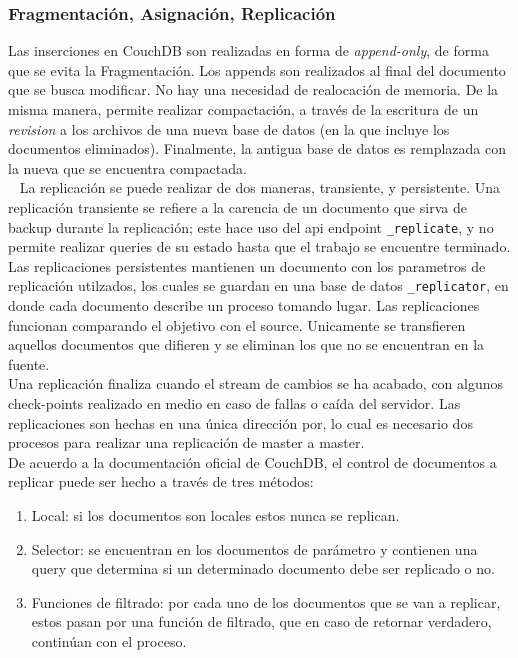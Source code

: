 \documentclass{article}
\begin{document}
\begin{itemize}
            \subsubsection{Fragmentación, Asignación, Replicación}
                Las inserciones en CouchDB son realizadas en forma de \textit{append-only}, de forma que se evita la Fragmentación. Los appends son realizados al final del documento que se busca modificar. No hay una necesidad de realocación de memoria. De la misma manera, permite realizar compactación, a través de la escritura de un \textit{revision} a los archivos de una nueva base de datos (en la que incluye los documentos eliminados). Finalmente, la antigua base de datos es remplazada con la nueva que se encuentra compactada. \\ 
                La replicación se puede realizar de dos maneras, transiente, y persistente. Una replicación transiente se refiere a la carencia de un documento que sirva de backup durante la replicación; este hace uso del api endpoint \texttt{\_replicate}, y no permite realizar queries de su estado hasta que el trabajo se encuentre terminado. Las replicaciones persistentes mantienen un documento con los parametros de replicación utilzados, los cuales se guardan en una base de datos \texttt{\_replicator}, en donde cada documento describe un proceso tomando lugar. Las replicaciones funcionan comparando el objetivo con el source. Unicamente se transfieren aquellos documentos que difieren y se eliminan los que no se encuentran en la fuente. \\
                Una replicación finaliza cuando el stream de cambios se ha acabado, con algunos check-points realizado en medio en caso de fallas o caída del servidor. Las replicaciones son hechas en una única dirección por, lo cual es necesario dos procesos para realizar una replicación de master a master. \\
                De acuerdo a la documentación oficial de CouchDB, el control de documentos a replicar puede ser hecho a través de tres métodos: 
                \begin{enumerate}
                    \item Local: si los documentos son locales estos nunca se replican. 
                    \item Selector: se encuentran en los documentos de parámetro y contienen una query que determina si un determinado documento debe ser replicado o no. 
                    \item Funciones de filtrado: por cada uno de los documentos que se van a replicar, estos pasan por una función de filtrado, que en caso de retornar verdadero, continúan con el proceso. 
                \end{enumerate}

\end{itemize}
\end{document}
